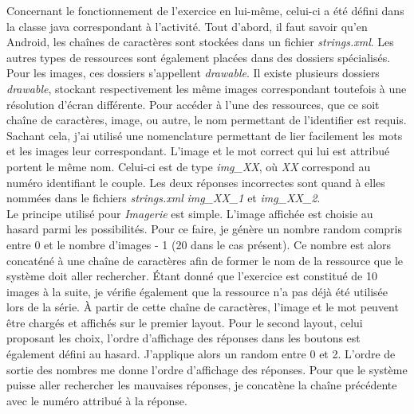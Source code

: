 Concernant le fonctionnement de l'exercice en lui-même, celui-ci a été défini dans la classe java correspondant à l'activité. Tout d'abord, il faut savoir qu'en Android, les chaînes de caractères sont stockées dans un fichier \textit{strings.xml}. Les autres types de ressources sont également placées dans des dossiers spécialisés. Pour les images, ces dossiers s'appellent \textit{drawable}. Il existe plusieurs dossiers \textit{drawable}, stockant respectivement les même images correspondant toutefois à une résolution d'écran différente. Pour accéder à l'une des ressources, que ce soit chaîne de caractères, image, ou autre, le nom permettant de l'identifier est requis. Sachant cela, j'ai utilisé une nomenclature permettant de lier facilement les mots et les images leur correspondant. L'image et le mot correct qui lui est attribué portent le même nom. Celui-ci est de type \textit{img\_XX}, où \textit{XX} correspond au numéro identifiant le couple. Les deux réponses incorrectes sont quand à elles nommées dans le fichiers \textit{strings.xml} \textit{img\_XX\_1} et \textit{img\_XX\_2}.\\

Le principe utilisé pour \textit{Imagerie} est simple. L'image affichée est choisie au hasard parmi les possibilités. Pour ce faire, je génère un nombre random compris entre 0 et le nombre d'images - 1 (20 dans le cas présent). Ce nombre est alors concaténé à une chaîne de caractères afin de former le nom de la ressource que le système doit aller rechercher. Étant donné que l'exercice est constitué de 10 images à la suite, je vérifie également que la ressource n'a pas déjà été utilisée lors de la série. À partir de cette chaîne de caractères, l'image et le mot peuvent être chargés et affichés sur le premier layout. Pour le second layout, celui proposant les choix, l'ordre d'affichage des réponses dans les boutons est également défini au hasard. J'applique alors un random entre 0 et 2. L'ordre de sortie des nombres me donne l'ordre d'affichage des réponses. Pour que le système puisse aller rechercher les mauvaises réponses, je concatène la chaîne précédente avec le numéro attribué à la réponse.\\

 
